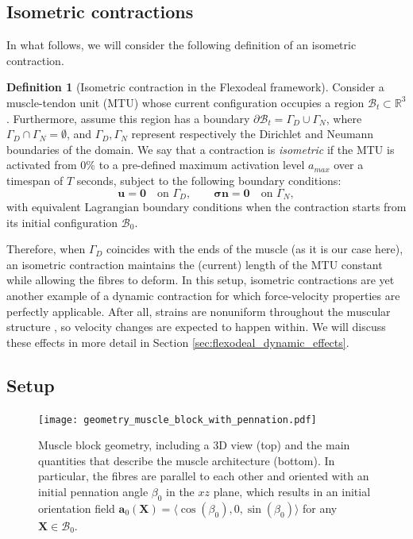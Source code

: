 \documentclass{sfuthesis}
\numberwithin{equation}{section}
\numberwithin{figure}{chapter}
\numberwithin{table}{chapter}
\theoremstyle{definition}
\newtheorem{definition}{Definition}[chapter]
\def\*#1{{\mathbf{#1}}} %
\newcommand{\R}{\mathbb{R}}
\newcommand{\B}{\mathcal{B}}
\def\bsigma{{\bm{\sigma}}}
\begin{document}
\subsection{Isometric contractions}

In what follows, we will consider the following definition of an isometric contraction.

\begin{definition}[Isometric contraction in the Flexodeal framework] \label{def:isometric_contraction_3d}
    Consider a muscle-tendon unit (MTU) whose current configuration occupies a region $\B_t \subset \R^3$. Furthermore, assume this region has a boundary $\partial\B_t = \Gamma_D \cup \Gamma_N$, where $\Gamma_D \cap \Gamma_N = \emptyset$, and $\Gamma_D,\Gamma_N$ represent respectively the Dirichlet and Neumann boundaries of the domain. We say that a contraction is \textit{isometric} if the MTU is activated from 0\% to a pre-defined maximum activation level $a_{max}$ over a timespan of $T$ seconds, subject to the following boundary conditions:
    \[
        \*u = \*0 \quad \text{on }\Gamma_D, \qquad \bsigma\*n = \*0 \quad \text{on } \Gamma_N,
    \]
    with equivalent Lagrangian boundary conditions when the contraction starts from its initial configuration $\B_0$.
\end{definition}

Therefore, when $\Gamma_D$ coincides with the ends of the muscle (as it is our case here), an isometric contraction maintains the (current) length of the MTU constant while allowing the fibres to deform. In this setup, isometric contractions are yet another example of a dynamic contraction for which force-velocity properties are perfectly applicable. After all, strains are nonuniform throughout the muscular structure \cite{BlemkerDelp2005}, so velocity changes are expected to happen within. We will discuss these effects in more detail in Section \ref{sec:flexodeal_dynamic_effects}.

\subsection{Setup}

\begin{figure}
    \centering
    \texttt{[image: geometry\_muscle\_block\_with\_pennation.pdf]}
    \caption{Muscle block geometry, including a 3D view (top) and the main quantities that describe the muscle architecture (bottom). In particular, the fibres are parallel to each other and oriented with an initial pennation angle $\beta_0$ in the $xz$ plane, which results in an initial orientation field $\*a_0(\*X) = \langle \cos(\beta_0), 0, \sin(\beta_0) \rangle$ for any $\*X \in \B_0$.\label{fig:muscle_block}}
\end{figure}
\end{document}
